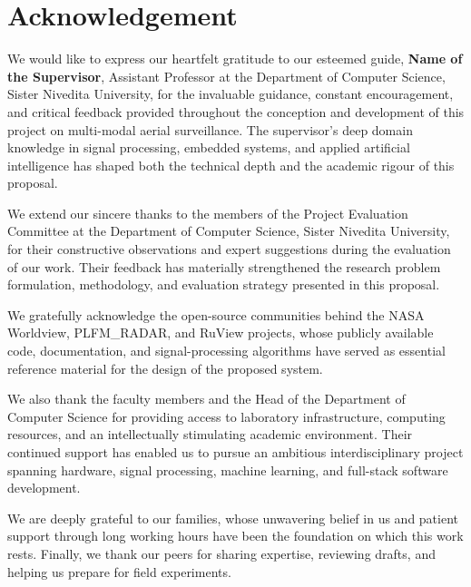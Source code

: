 \chapter{Acknowledgement}
\vspace{-0.5cm}
\singlespacing

We would like to express our heartfelt gratitude to our esteemed guide, \textbf{Name of the Supervisor}, Assistant Professor at the Department of Computer Science, Sister Nivedita University, for the invaluable guidance, constant encouragement, and critical feedback provided throughout the conception and development of this project on multi-modal aerial surveillance. The supervisor's deep domain knowledge in signal processing, embedded systems, and applied artificial intelligence has shaped both the technical depth and the academic rigour of this proposal.

We extend our sincere thanks to the members of the Project Evaluation Committee at the Department of Computer Science, Sister Nivedita University, for their constructive observations and expert suggestions during the evaluation of our work. Their feedback has materially strengthened the research problem formulation, methodology, and evaluation strategy presented in this proposal.

We gratefully acknowledge the open-source communities behind the NASA Worldview, PLFM\_RADAR, and RuView projects, whose publicly available code, documentation, and signal-processing algorithms have served as essential reference material for the design of the proposed system.

We also thank the faculty members and the Head of the Department of Computer Science for providing access to laboratory infrastructure, computing resources, and an intellectually stimulating academic environment. Their continued support has enabled us to pursue an ambitious interdisciplinary project spanning hardware, signal processing, machine learning, and full-stack software development.

We are deeply grateful to our families, whose unwavering belief in us and patient support through long working hours have been the foundation on which this work rests. Finally, we thank our peers for sharing expertise, reviewing drafts, and helping us prepare for field experiments.



\def\studentNameOne{Student Name 1}
\def\studentRegOne{XXXXXXXXXXX}

